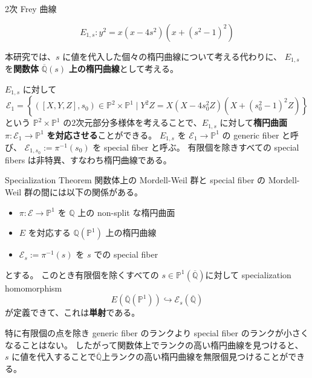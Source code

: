 \documentclass{classes/mybeamer}
\begin{document}
\begin{frame}{2次 Frey 曲線}
    \begin{eg*}
        \begin{equation*}
            E_{1,s}: y^{2} = x(x - 4s^{2})(x + (s^{2} - 1)^{2})
        \end{equation*}
    \end{eg*}
    本研究では、$s$ に値を代入した個々の楕円曲線について考える代わりに、 $E_{1,s}$ を\textbf{関数体} $\overline{\mathbb{Q}}(s)$ \textbf{上の楕円曲線}として考える。
    \vspace{1cm}

    $E_{1,s}$ に対して
    \begin{equation*}
        \mathcal{E}_{1} = \left\{ ([X,Y,Z],s_0) \in \mathbb{P}^{2} \times \mathbb{P}^{1} \mid Y^{2}Z = X(X - 4s_{0}^{2}Z)(X + (s_{0}^{2} - 1)^{2}Z) \right\}
    \end{equation*}
    という $\mathbb{P}^{2} \times \mathbb{P}^{1}$ の$2$次元部分多様体を考えることで、$E_{1,s}$ に対して\textbf{楕円曲面} $\pi: \mathcal{E}_{1}\to \mathbb{P}^{1}$ \textbf{を対応させる}ことができる。
    $E_{1,s}$ を $\mathcal{E}_{1} \to \mathbb{P}^{1}$ の generic fiber と呼び、 $\mathcal{E}_{1,s_0}:=\pi^{-1}(s_0)$ を special fiber と呼ぶ。
    有限個を除きすべての special fibers は非特異、すなわち楕円曲線である。
\end{frame}

\begin{frame}{Specialization Theorem}
    関数体上の Mordell-Weil 群と special fiber の Mordell-Weil 群の間には以下の関係がある。
    \begin{thm}
        \label{thm:specialization}
        \begin{itemize}
            \item $\pi:\mathcal{E} \to \mathbb{P}^1$ を $\mathbb{Q}$ 上の non-split な楕円曲面
            \item $E$ を対応する $\mathbb{Q}(\mathbb{P}^1)$ 上の楕円曲線
            \item $\mathcal{E}_s:=\pi^{-1}(s)$ を $s$ での special fiber
        \end{itemize}
        とする。
        このとき有限個を除くすべての $s \in \mathbb{P}^1(\overline{\mathbb{Q}})$に対して specialization homomorphism
        \begin{equation*}
            E(\overline{\mathbb{Q}}(\mathbb{P}^1)) \hookrightarrow \mathcal{E}_{s}(\overline{\mathbb{Q}})
        \end{equation*}
        が定義できて、これは\textbf{単射}である。
    \end{thm}
    特に有限個の点を除き generic fiber のランクより special fiber のランクが小さくなることはない。
    したがって関数体上でランクの高い楕円曲線を見つけると、 $s$ に値を代入することで$\overline{\mathbb{Q}}$上ランクの高い楕円曲線を無限個見つけることができる。
\end{frame}
\end{document}

